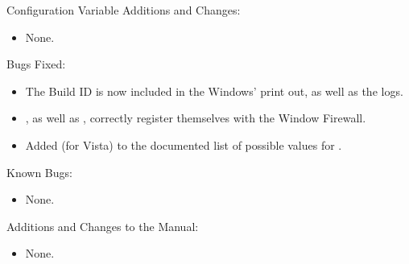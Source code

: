 \noindent Configuration Variable Additions and Changes:

\begin{itemize}

\item None.

\end{itemize}

\noindent Bugs Fixed:

\begin{itemize}

\item The Build ID is now included in the Windows'  print
      out, as well as the logs.

\item {}, as well as , correctly register 
      themselves with the Window Firewall.

\item Added  (for Vista) to the documented list of 
      possible values for .

\end{itemize}

\noindent Known Bugs:

\begin{itemize}

\item None.

\end{itemize}

\noindent Additions and Changes to the Manual:

\begin{itemize}

\item None.

\end{itemize}

